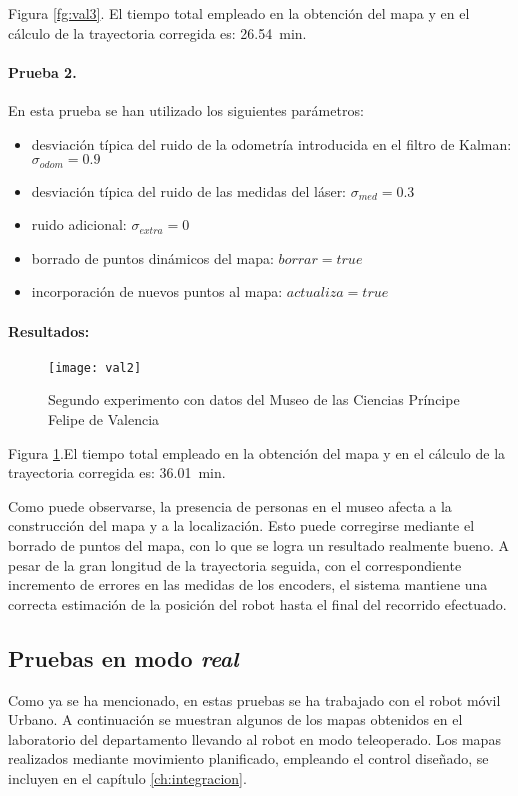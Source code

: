 Figura \ref{fg:val3}. El tiempo total empleado en la obtención del mapa y en el cálculo de la trayectoria corregida es: 26.54~min.


\paragraph{Prueba 2.} En esta prueba se han utilizado los siguientes parámetros:
\begin{itemize}
  \item desviación típica del ruido de la odometría introducida en el filtro de Kalman: $\sigma_{odom} = 0.9$
  \item desviación típica del ruido de las medidas del láser: $\sigma_{med} = 0.3$
  \item ruido adicional: $\sigma_{extra} = 0$
  \item borrado de puntos dinámicos del mapa: $borrar = true$
  \item incorporación de nuevos puntos al mapa: $actualiza = true$
\end{itemize}

\paragraph{Resultados:}
\begin{figure}[h]
  \centering\texttt{[image: val2]}\\
  \caption{Segundo experimento con datos del Museo de las Ciencias Príncipe Felipe de Valencia}\label{fg:val2}
\end{figure}

Figura \ref{fg:val2}.El tiempo total empleado en la obtención del mapa y en el cálculo de la trayectoria corregida es: 36.01~min.

Como puede observarse, la presencia de personas en el museo afecta a la construcción del mapa y a la localización. Esto puede corregirse mediante el borrado de puntos del mapa, con lo que se logra un resultado realmente bueno. A pesar de la gran longitud de la trayectoria seguida, con el correspondiente incremento de errores en las medidas de los encoders, el sistema mantiene una correcta estimación de la posición del robot hasta el final del recorrido efectuado.

\subsection{Pruebas en modo \emph{real}}
Como ya se ha mencionado, en estas pruebas se ha trabajado con el robot móvil Urbano. A continuación se muestran algunos de los mapas obtenidos en el laboratorio del departamento llevando al robot en modo teleoperado. Los mapas realizados mediante movimiento planificado, empleando el control diseñado, se incluyen en el capítulo \ref{ch:integracion}.
